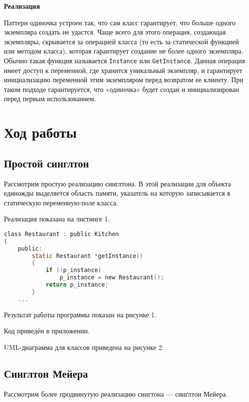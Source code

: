 {\bf Реализация}

Паттерн одиночка устроен так, что сам класс гарантирует, что больше одного экземпляра создать не удастся. Чаще всего для этого операция, создающая экземпляры, скрывается за операцией класса (то есть за статической функцией или методом класса), которая гарантирует создание не более одного экземпляра. Обычно такая функция называется \texttt{Instance} или \texttt{GetInstance}. Данная операция имеет доступ к переменной, где хранится уникальный экземпляр, и гарантирует инициализацию переменной этим экземпляром перед возвратом ее клиенту. При таком подходе гарантируется, что «одиночка» будет создан и инициализирован перед первым использованием.
\clearpage



\section{Ход работы}

\subsection{Простой синглтон}
Рассмотрим простую реализацию синглтона. В этой реализации для объекта единожды выделяется область памяти, указатель на которую записывается в статическую переменную-поле класса.

Реализация показана на листинге 1.

\begin{lstlisting}[language=c, caption={Простой синглтон}, lineskip={0pt}]
class Restaurant : public Kitchen
{
    public:
        static Restaurant *getInstance()
        {
            if (!p_instance)
                p_instance = new Restaurant();
            return p_instance;
        }
    ...
\end{lstlisting}

Результат работы программы показан на рисунке 1.


Код приведён в приложении.

UML-диаграмма для классов приведена на рисунке 2.



\subsection{Синглтон Мейера}
Рассмотрим более продвинутую реализацию сингтона — синглтон Мейера. 


